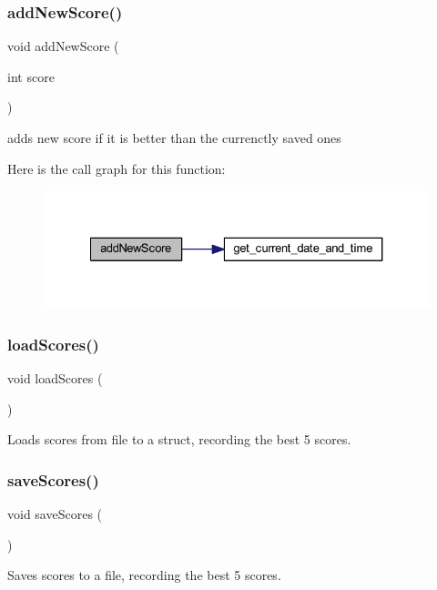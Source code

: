 \subsubsection{\texorpdfstring{addNewScore()}{addNewScore()}}
{\footnotesize\ttfamily void add\+New\+Score (\begin{DoxyParamCaption}\item[{int}]{score }\end{DoxyParamCaption})}



adds new score if it is better than the currenctly saved ones 

Here is the call graph for this function\+:
\nopagebreak
\begin{figure}[H]
\begin{center}
\leavevmode
\includegraphics[width=327pt]{group__score_ga9c2c75b1284995e5edb64e1381679730_cgraph}
\end{center}
\end{figure}
\mbox{\label{group__score_ga1d81d36cfc183a1a1c8524facb3497aa}} 
\subsubsection{\texorpdfstring{loadScores()}{loadScores()}}
{\footnotesize\ttfamily void load\+Scores (\begin{DoxyParamCaption}{ }\end{DoxyParamCaption})}



Loads scores from file to a struct, recording the best 5 scores. 

\mbox{\label{group__score_ga857943eead55a1059d11f95f7f1c936b}} 
\subsubsection{\texorpdfstring{saveScores()}{saveScores()}}
{\footnotesize\ttfamily void save\+Scores (\begin{DoxyParamCaption}{ }\end{DoxyParamCaption})}



Saves scores to a file, recording the best 5 scores. 

